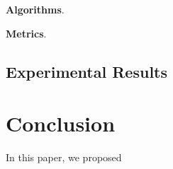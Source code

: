 \documentclass[sigconf, nonacm]{acmart}
\begin{document}
\noindent\textbf{Algorithms}. 

\noindent\textbf{Metrics}. 

\subsection{Experimental Results}

\section{Conclusion}

In this paper, we proposed 






\end{document}
